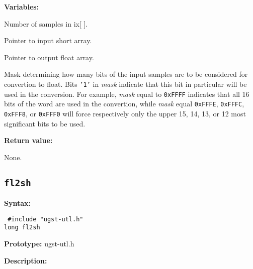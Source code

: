 {\bf Variables: }
\begin{Descr}{\DescrLen}
 \item[\pbox{20mm}{\em n}] %
                     Number of samples in ix[ ].

 \item[\pbox{20mm}{\em ix}] %
                     Pointer to input short array.

 \item[\pbox{20mm}{\em y}] %
                     Pointer to output float array.

 \item[\pbox{20mm}{\em mask}] %
                      Mask determining how many bits of the
                      input samples are to be considered for
                      convertion to float. Bits {\tt '1'} in {\em
                      mask} indicate that this bit in particular will
                      be used in the conversion. For example, {\em
                      mask} equal to {\tt 0xFFFF} indicates that all 16 bits
                      of the word are used in the convertion, while
                      {\em mask} equal {\tt 0xFFFE}, {\tt 0xFFFC},
                      {\tt 0xFFF8}, or {\tt 0xFFF0} will force
                      respectively only the upper 15, 14, 13, or 12
                      most significant bits to be used.
\end{Descr}

{\bf Return value: }

None.


\subsection{{\tt fl2sh}}

{\bf Syntax: }

{\tt
\#include "ugst-utl.h"\\
long fl2sh
}

{\bf Prototype: }    ugst-utl.h

{\bf Description: }

